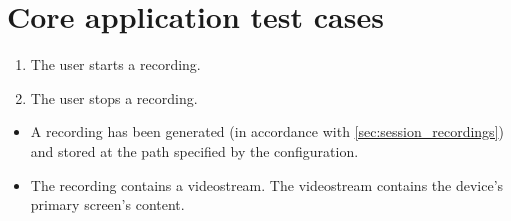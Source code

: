 \section{Core application test cases}
\begin{tests}
    {\begin{enumerate}
        \item The \gls{user} starts a recording.
        \item The \gls{user} stops a recording.
    \end{enumerate}}
    {\begin{itemize}
        \item A recording has been generated (in accordance with \ref{sec:session_recordings}) and stored at the path specified by the configuration.
        \item The recording contains a \gls{videostream}. The \gls{videostream} contains the \gls{device}'s primary screen's content.
    \end{itemize}}


\end{tests}
